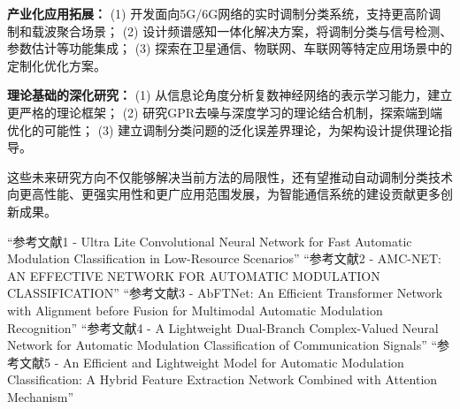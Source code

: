 \documentclass[conference]{IEEEtran}
\begin{document}
\textbf{产业化应用拓展：}
(1) 开发面向5G/6G网络的实时调制分类系统，支持更高阶调制和载波聚合场景；
(2) 设计频谱感知一体化解决方案，将调制分类与信号检测、参数估计等功能集成；
(3) 探索在卫星通信、物联网、车联网等特定应用场景中的定制化优化方案。

\textbf{理论基础的深化研究：}
(1) 从信息论角度分析复数神经网络的表示学习能力，建立更严格的理论框架；
(2) 研究GPR去噪与深度学习的理论结合机制，探索端到端优化的可能性；
(3) 建立调制分类问题的泛化误差界理论，为架构设计提供理论指导。

这些未来研究方向不仅能够解决当前方法的局限性，还有望推动自动调制分类技术向更高性能、更强实用性和更广应用范围发展，为智能通信系统的建设贡献更多创新成果。


\begin{thebibliography}{00}

 ``参考文献1 - Ultra Lite Convolutional Neural Network for Fast Automatic Modulation Classification in Low-Resource Scenarios''
 ``参考文献2 - AMC-NET: AN EFFECTIVE NETWORK FOR AUTOMATIC MODULATION CLASSIFICATION''
 ``参考文献3 - AbFTNet: An Efficient Transformer Network with Alignment before Fusion for Multimodal Automatic Modulation Recognition''
 ``参考文献4 - A Lightweight Dual-Branch Complex-Valued Neural Network for Automatic Modulation Classification of Communication Signals''
 ``参考文献5 - An Efficient and Lightweight Model for Automatic Modulation Classification: A Hybrid Feature Extraction Network Combined with Attention Mechanism''

\end{thebibliography}
\end{document}
